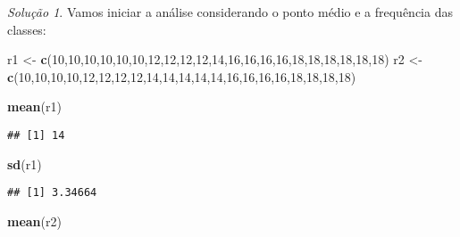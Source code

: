 \documentclass[
]{latex/krantz}
\newenvironment{Shaded}{\begin{snugshade}}{\end{snugshade}}
\newcommand{\DecValTok}[1]{\textcolor[rgb]{0.00,0.00,0.81}{#1}}
\newcommand{\FunctionTok}[1]{\textcolor[rgb]{0.13,0.29,0.53}{\textbf{#1}}}
\newcommand{\NormalTok}[1]{#1}
\newcommand{\OtherTok}[1]{\textcolor[rgb]{0.56,0.35,0.01}{#1}}
\theoremstyle{definition}
\theoremstyle{definition}
\theoremstyle{definition}
\theoremstyle{definition}
\theoremstyle{remark}
\newtheorem*{solution}{Solução}
\begin{document}
\begin{solution}
Vamos iniciar a análise considerando o ponto médio e a frequência das classes:

\begin{Shaded}
\begin{Highlighting}[]
\NormalTok{r1 }\OtherTok{\textless{}{-}} \FunctionTok{c}\NormalTok{(}\DecValTok{10}\NormalTok{,}\DecValTok{10}\NormalTok{,}\DecValTok{10}\NormalTok{,}\DecValTok{10}\NormalTok{,}\DecValTok{10}\NormalTok{,}\DecValTok{10}\NormalTok{,}\DecValTok{12}\NormalTok{,}\DecValTok{12}\NormalTok{,}\DecValTok{12}\NormalTok{,}\DecValTok{12}\NormalTok{,}\DecValTok{14}\NormalTok{,}\DecValTok{16}\NormalTok{,}\DecValTok{16}\NormalTok{,}\DecValTok{16}\NormalTok{,}\DecValTok{16}\NormalTok{,}\DecValTok{18}\NormalTok{,}\DecValTok{18}\NormalTok{,}\DecValTok{18}\NormalTok{,}\DecValTok{18}\NormalTok{,}\DecValTok{18}\NormalTok{,}\DecValTok{18}\NormalTok{)}
\NormalTok{r2 }\OtherTok{\textless{}{-}} \FunctionTok{c}\NormalTok{(}\DecValTok{10}\NormalTok{,}\DecValTok{10}\NormalTok{,}\DecValTok{10}\NormalTok{,}\DecValTok{10}\NormalTok{,}\DecValTok{12}\NormalTok{,}\DecValTok{12}\NormalTok{,}\DecValTok{12}\NormalTok{,}\DecValTok{12}\NormalTok{,}\DecValTok{14}\NormalTok{,}\DecValTok{14}\NormalTok{,}\DecValTok{14}\NormalTok{,}\DecValTok{14}\NormalTok{,}\DecValTok{14}\NormalTok{,}\DecValTok{16}\NormalTok{,}\DecValTok{16}\NormalTok{,}\DecValTok{16}\NormalTok{,}\DecValTok{16}\NormalTok{,}\DecValTok{18}\NormalTok{,}\DecValTok{18}\NormalTok{,}\DecValTok{18}\NormalTok{,}\DecValTok{18}\NormalTok{)}

\FunctionTok{mean}\NormalTok{(r1)}
\end{Highlighting}
\end{Shaded}

\begin{verbatim}
## [1] 14
\end{verbatim}

\begin{Shaded}
\begin{Highlighting}[]
\FunctionTok{sd}\NormalTok{(r1)}
\end{Highlighting}
\end{Shaded}

\begin{verbatim}
## [1] 3.34664
\end{verbatim}

\begin{Shaded}
\begin{Highlighting}[]
\FunctionTok{mean}\NormalTok{(r2)}
\end{Highlighting}
\end{Shaded}


\end{solution}
\end{document}
